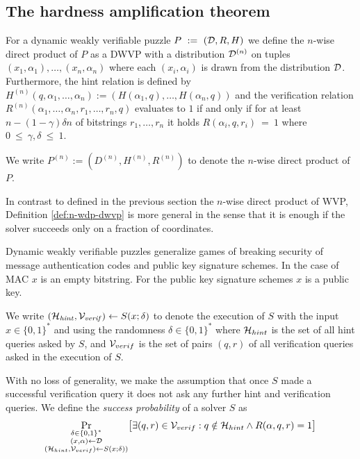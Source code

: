 \subsection{The hardness amplification theorem}
\begin{definition}
  \label{def:n-wdp-dwvp}
For a dynamic weakly verifiable puzzle $P~:=~(\mathcal{D}, R, H)$ we define the $n$-wise direct product of $P$
as a DWVP with a distribution $\mathcal{D}^{(n)}$ on tuples $(x_1, \alpha_1), \dotsc, (x_n, \alpha_n)$ where
each $(x_i, \alpha_i)$ is drawn from the distribution $\mathcal{D}$.
Furthermore, the hint relation is defined by $H^{(n)}(q, \alpha_1, \dotsc, \alpha_n) := (H(\alpha_1, q), \dotsc, H(\alpha_n, q))$ and
the verification relation $R^{(n)}(\alpha_1, \dotsc, \alpha_n, r_1, \dotsc, r_n, q)$ evaluates to $1$ if and only if
for at least $n - (1 - \gamma)\delta n$ of bitstrings $r_1, \dotsc, r_n $ it holds $R(\alpha_i, q, r_i)~=~1$ where $0~\leq~\gamma,\delta~\leq~1$.
%
\end{definition}
We write $P^{(n)} := (D^{(n)}, H^{(n)}, R^{(n)})$ to denote the $n$-wise direct product of $P$.

In contrast to defined in the previous section the $n$-wise direct product of WVP, Definition \ref{def:n-wdp-dwvp}
is more general in the sense that it is enough if the solver succeeds only on a fraction of coordinates.

Dynamic weakly verifiable puzzles generalize games of breaking security of message authentication codes and public key signature schemes.
In the case of MAC $x$ is an empty bitstring. For the public key signature schemes $x$ is a public key.

We write $(\mathcal{H}_{\mathit{hint}}, \mathcal{V}_{\mathit{verif}}) \leftarrow S(x; \delta)$ to denote
the execution of $S$ with the input $x \in \{0,1\}^{*}$ and using the randomness $\delta \in \{0,1\}^{*}$
where $\mathcal{H}_{hint}$ is the set of all hint queries asked by $S$, and $\mathcal{V}_{verif}$ is
the set of pairs $(q,r)$ of all verification queries asked in the execution of $S$.

With no loss of generality, we make the assumption that once $S$
made a successful verification query it does not ask any further hint and verification queries.
We define the \textit{success probability} of a solver $S$ as
\begin{align*}
  \underset{\substack{\delta \in \{0,1\}^{*} \\(x,\alpha) \leftarrow \mathcal{D} \\ (\mathcal{H}_{hint}, \mathcal{V}_{verif}) \leftarrow S(x;\delta))}}
  {\Pr}\big[\exists (q,r) \in \mathcal{V}_{verif} : q \notin \mathcal{H}_{hint} \land R(\alpha, q, r) = 1 \big]
\end{align*}

